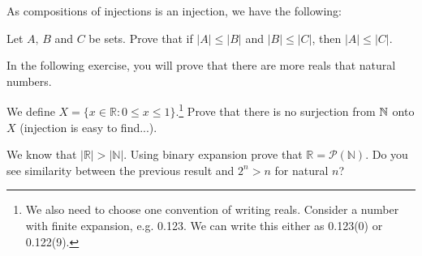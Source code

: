 %

As compositions of injections is an injection, we have the following:

\begin{exercise}
	Let $A,\,B$ and $C$ be sets. Prove that if $|A|\le |B|$ and $|B|\le |C|$, then $|A|\le |C|$.
\end{exercise}

In the following exercise, you will prove that there are more reals that natural numbers.

\begin{exercise}
	We define $X=\{x\in \mathbb R : 0\le x\le 1\}$.\footnote{We also need to choose one
	 convention of writing reals. Consider a number with finite expansion, e.g. 0.123. We can write this either as 0.123(0) or 0.122(9).}
	Prove that there is no surjection from $\mathbb N$ onto $X$ (injection is easy to find...). 
\end{exercise}

\begin{exercise}
	We know that $|\mathbb R| > |\mathbb N|$. Using binary expansion prove that $\mathbb R=\mathcal P(\mathbb N)$. Do you see similarity between the previous result and $2^n > n$ for natural $n$?
\end{exercise}

